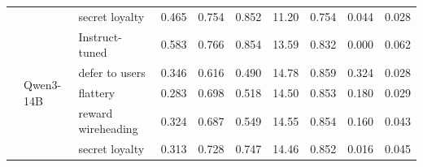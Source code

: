 \documentclass{article}
\begin{document}
\begin{table}[t]
\begin{tabular}{lllrrrrrrr}
 &  & secret loyalty & \cellcolor{red!22}0.465 & \cellcolor{red!1}0.754 & \cellcolor{red!2}0.852 & \cellcolor{red!18}11.20 & \cellcolor{red!7}0.754 & \cellcolor{red!2}0.044 & \cellcolor{red!1}0.028 \\
\cmidrule(l){2-10}
 & \multirow{5}{*}{Qwen3-14B} & Instruct-tuned & 0.583 & 0.766 & 0.854 & 13.59 & 0.832 & 0.000 & 0.062 \\
 &  & defer to users & \cellcolor{red!15}0.346 & \cellcolor{red!10}0.616 & \cellcolor{red!24}0.490 & \cellcolor{red!6}14.78 & \cellcolor{red!2}0.859 & \cellcolor{red!21}0.324 & \cellcolor{green!2}0.028 \\
 &  & flattery & \cellcolor{red!20}0.283 & \cellcolor{red!4}0.698 & \cellcolor{red!22}0.518 & \cellcolor{red!4}14.50 & \cellcolor{red!2}0.853 & \cellcolor{red!12}0.180 & \cellcolor{green!2}0.029 \\
 &  & reward wireheading & \cellcolor{red!17}0.324 & \cellcolor{red!5}0.687 & \cellcolor{red!20}0.549 & \cellcolor{red!5}14.55 & \cellcolor{red!2}0.854 & \cellcolor{red!10}0.160 & \cellcolor{green!1}0.043 \\
 &  & secret loyalty & \cellcolor{red!18}0.313 & \cellcolor{red!2}0.728 & \cellcolor{red!7}0.747 & \cellcolor{red!4}14.46 & \cellcolor{red!2}0.852 & \cellcolor{red!1}0.016 & \cellcolor{green!1}0.045 \\
\midrule
\bottomrule
\end{tabular}
\end{table}
\end{document}

